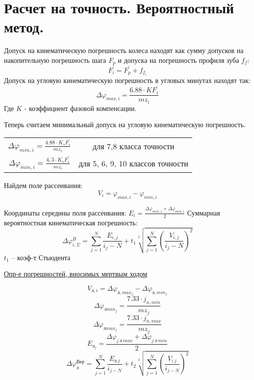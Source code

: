 \documentclass{article}
\begin{document}
\section{Расчет на точность. Вероятностный метод.}

Допуск на кинематическую погрешность колеса находят как сумму допусков на накопительную
погрешность шага $F_p$ и допуска на погрешность профиля зуба $f_f$:
$$
F_i^{'} = F_p^{'} + f_{f_i}
$$
Допуск на угловую кинематическую погрешность в угловых минутах находят так:
$$
\Delta \varphi_{max, i} = \frac{6.88 \cdot K F_i^{'}}{m z_i} 
$$
Где $K$ - коэффициент фазовой компенсации.

Теперь считаем минимальный допуск на угловую кинематическую погрешность.

\begin{tabular}{cc}
$ \Delta \varphi_{min,i} = \frac{4.88 \cdot K_s F_i^{'}}{m z_i} $ & для 7,8 класса точности \\
$ \Delta \varphi_{min,i} = \frac{4,3 \cdot K_s F_i^{'}}{m z_i} $  & для 5, 6, 9, 10 классов точности
\end{tabular}

Найдем поле рассеивания:
$$
V_i = \varphi_{max, i} - \varphi_{min, i}
$$

Координаты середины поля рассеивания: $E_i = \frac{ \Delta \varphi_{max, i} + \Delta \varphi_{min, i}}{2} $
Суммарная вероятностная кинематическая погрешность:
$$
\Delta \varphi_{i, \Sigma}^{B} = \sum\limits_{j = 1}^{N} \frac{E_{i,j}}{i_j - N} + t_1 \sqrt[2]{\sum\limits_{j = 1}^{N} \left(\frac{V_{i,j}}{i_j - N}\right)^2}
$$
$t_1$ -- коэф-т Стьюдента

\underline{Опр-е погрешностей, вносимых мертвым ходом} 

$$
V_{л, i} = \Delta \varphi_{л, max_j} - \Delta \varphi_{л, min_j}
$$
$$
\Delta \varphi_{л min_j} = \frac{7.33 \cdot j_{n, min}}{m z_j} 
$$
$$
\Delta \varphi_{л max_j} = \frac{7.33 \cdot j_{n, max}}{m z_j} 
$$
$$
E_{л_j} = \frac{ \Delta \varphi_{j \: л \: max} + \Delta \varphi_{j \: л \: min}}{2}
$$
$$
\Delta \varphi_{л}^{Вер} = \sum\limits_{j = 1}^{N} \frac{E_{л \: j}}{i_{j - N}} + t_2 \sqrt[2]{\sum\limits_{j = 1}^{N} \left(\frac{V_{i \: j}}{i_{j - N}} \right)^2}
$$
\end{document}
